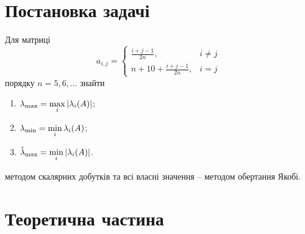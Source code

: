 




\section{Постановка задачі}

Для матриці \[ a_{i,j} = \begin{cases} \frac{i+j-1}{2n}, & i \ne j \\ n + 10 + \frac{i+j-1}{2n}, & i = j \end{cases} \] порядку $n = 5, 6, \ldots$ знайти 
\begin{enumerate}
	\item $\lambda_{\max} = \displaystyle\max\limits_i|\lambda_i(A)|$;
	\item $\lambda_{\min} = \displaystyle\min\limits_i \lambda_i(A)$;
	\item $\hat \lambda_{\max} = \displaystyle\min\limits_i|\lambda_i(A)|$.
\end{enumerate}
методом скалярних добутків та всі власні значення -- методом обертання Якобі.

\section{Теоретична частина}


